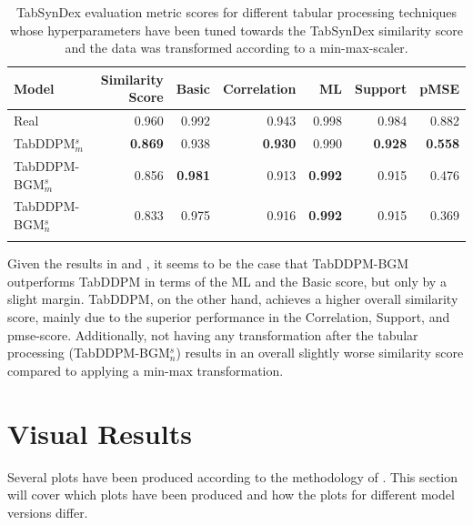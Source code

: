 \begin{table}[h]
	\centering
	\begin{tabular}{lrrrrrr}
		\toprule
		\textbf{Model}        & \textbf{Similarity Score} & \textbf{Basic} & \textbf{Correlation} & \textbf{ML}    & \textbf{Support} & \textbf{pMSE}  \\
		\midrule
		Real                  & 0.960                     & 0.992          & 0.943                & 0.998          & 0.984            & 0.882          \\
		TabDDPM$^{s}_{m}$     & \textbf{0.869}            & 0.938          & \textbf{0.930}       & 0.990          & \textbf{0.928}   & \textbf{0.558} \\
		TabDDPM-BGM$^{s}_{m}$ & 0.856                     & \textbf{0.981} & 0.913                & \textbf{0.992} & 0.915            & 0.476          \\
		TabDDPM-BGM$^{s}_{n}$ & 0.833                     & 0.975          & 0.916                & \textbf{0.992} & 0.915            & 0.369          \\
		\bottomrule
		\multicolumn{7}{c}{}\\[-0.6em]
	\end{tabular}
	\caption[Experiment 3 TabSynDex]{TabSynDex evaluation metric scores for different tabular processing techniques whose hyperparameters have been tuned towards the TabSynDex similarity score
		and the data was transformed according to a min-max-scaler.}
	\label{tab:exp3-sim}
\end{table}

Given the results in  and , it seems to be the case that TabDDPM-BGM outperforms TabDDPM in terms of the ML and the Basic score, but only by a slight margin.
TabDDPM, on the other hand, achieves a higher overall similarity score, mainly due to the superior performance in the Correlation, Support, and \gls{pmse}-score.
Additionally, not having any transformation after the tabular processing (TabDDPM-BGM$^{s}_{n}$) results in an overall slightly worse similarity score compared to applying a min-max transformation.
\newpage
\section{Visual Results}
\label{ch:results-Visual}

Several plots have been produced according to the methodology of \cite{brenninkmeijer2019GenerationEvaluationTabular}.
This section will cover which plots have been produced and how the plots for different model versions differ.

